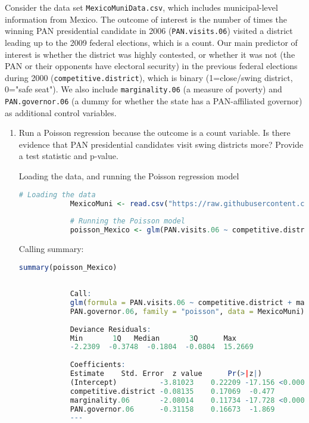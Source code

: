\documentclass[12pt,letterpaper]{article}
\begin{document}
	\noindent Consider the data set \texttt{MexicoMuniData.csv}, which includes municipal-level information from Mexico. The outcome of interest is the number of times the winning PAN presidential candidate in 2006 (\texttt{PAN.visits.06}) visited a district leading up to the 2009 federal elections, which is a count. Our main predictor of interest is whether the district was highly contested, or whether it was not (the PAN or their opponents have electoral security) in the previous federal elections during 2000 (\texttt{competitive.district}), which is binary (1=close/swing district, 0="safe seat"). We also include \texttt{marginality.06} (a measure of poverty) and \texttt{PAN.governor.06} (a dummy for whether the state has a PAN-affiliated governor) as additional control variables. 
	
	\begin{enumerate}
		\item [(a)]
		Run a Poisson regression because the outcome is a count variable. Is there evidence that PAN presidential candidates visit swing districts more? Provide a test statistic and p-value.
		
		\vspace{.2cm}
		
		Loading the data, and running the Poisson regression model
		\begin{lstlisting}[language=R]
			# Loading the data
			MexicoMuni <- read.csv("https://raw.githubusercontent.com/ASDS-TCD/StatsII_Spring2023/main/datasets/MexicoMuniData.csv")
			
			# Running the Poisson model
			poisson_Mexico <- glm(PAN.visits.06 ~ competitive.district + marginality.06 + PAN.governor.06, data = MexicoMuni, family = "poisson")
		\end{lstlisting}
		
		\vspace{.35cm}
		
		Calling summary:
		\begin{lstlisting}[language=R]
			summary(poisson_Mexico)
			
			
			Call:
			glm(formula = PAN.visits.06 ~ competitive.district + marginality.06 + 
			PAN.governor.06, family = "poisson", data = MexicoMuni)
			
			Deviance Residuals: 
			Min       1Q   Median       3Q      Max  
			-2.2309  -0.3748  -0.1804  -0.0804  15.2669  
			
			Coefficients:
			Estimate 	Std. Error 	z value      Pr(>|z|)    
			(Intercept)          -3.81023    0.22209 -17.156 <0.0000000000000002 ***
			competitive.district -0.08135    0.17069  -0.477              0.6336    
			marginality.06       -2.08014    0.11734 -17.728 <0.0000000000000002 ***
			PAN.governor.06      -0.31158    0.16673  -1.869              0.0617 .  
			---
			

\end{lstlisting}
\end{enumerate}
\end{document}
